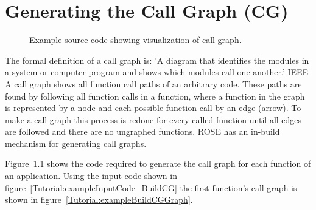 \chapter{Generating the Call Graph (CG)}

\begin{figure}[!h]
{\indent
{\mySmallFontSize

\label{Tutorial:exampleBuildCG}

\begin{latexonly}
   
\end{latexonly}

\begin{htmlonly}
   
\end{htmlonly}

}
}
\caption{Example source code showing visualization of call graph.}
\end{figure}

The formal definition of a call graph is: 
\newline\newline
'A diagram that identifies the modules in a system or computer program and shows which modules call one another.' IEEE 
\newline\newline
A call graph shows all function call paths of an arbitrary code. These paths are found by following all 
function calls in a function, where a function in the graph is represented by a node and each possible function call by
an edge (arrow). To make a call graph this process is  redone for every called function until all edges are followed
and there are no ungraphed functions. ROSE has an in-build mechanism for generating call graphs. 

   Figure~\ref{Tutorial:exampleBuildCG} shows the code required to generate
the call graph for each function of an application.  Using the input code shown in
figure~\ref{Tutorial:exampleInputCode_BuildCG} the first function's call graph is
shown in figure~\ref{Tutorial:exampleBuildCGGraph}.

